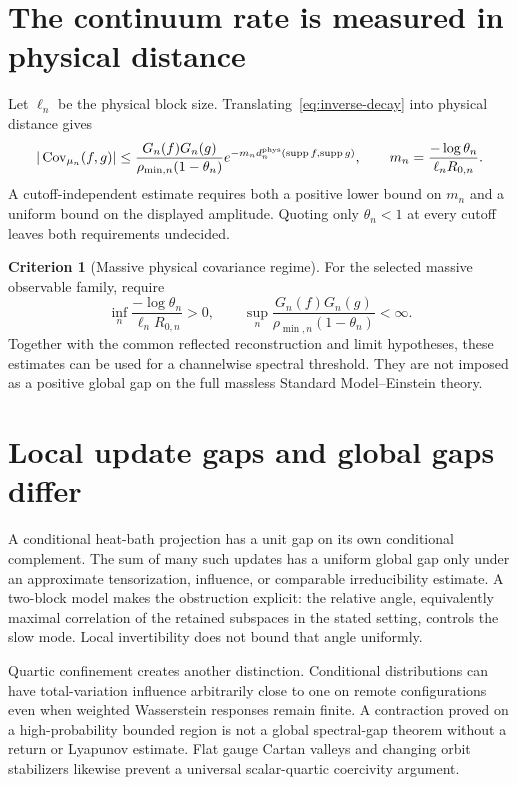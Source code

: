 \documentclass[11pt,a4paper,oneside]{book}
\theoremstyle{plain}
\theoremstyle{definition}
\newtheorem{criterion}[theorem]{Criterion}
\theoremstyle{remark}
\newcommand{\Cov}{\operatorname{Cov}}
\newcommand{\supp}{\operatorname{supp}}
\newcommand{\src}[2]{\cite{#1}}
\begin{document}
\section{The continuum rate is measured in physical distance}
Let $\ell_n$ be the physical block size. Translating~\eqref{eq:inverse-decay} into physical distance gives
\begin{equation}
 |\Cov_{\mu_n}(f,g)|\le
 \frac{G_n(f)G_n(g)}{\rho_{\min,n}(1-\theta_n)}
 e^{-m_n d_n^{\rm phys}(\supp f,\supp g)},
 \qquad
 m_n=\frac{-\log\theta_n}{\ell_nR_{0,n}}.
 \label{eq:physical-decay}
\end{equation}
A cutoff-independent estimate requires both a positive lower bound on $m_n$ and a uniform bound on the displayed amplitude. Quoting only $\theta_n<1$ at every cutoff leaves both requirements undecided. \src{R16}{thm:v16v85-physical}

\begin{criterion}[Massive physical covariance regime]
\label{crit:massive}
For the selected massive observable family, require
\begin{equation}
 \inf_n\frac{-\log\theta_n}{\ell_nR_{0,n}}>0,
 \qquad
 \sup_n\frac{G_n(f)G_n(g)}{\rho_{\min,n}(1-\theta_n)}<\infty.
 \label{eq:massive-regime}
\end{equation}
Together with the common reflected reconstruction and limit hypotheses, these estimates can be used for a channelwise spectral threshold. They are not imposed as a positive global gap on the full massless Standard Model--Einstein theory.
\end{criterion}

\section{Local update gaps and global gaps differ}
A conditional heat-bath projection has a unit gap on its own conditional complement. The sum of many such updates has a uniform global gap only under an approximate tensorization, influence, or comparable irreducibility estimate. A two-block model makes the obstruction explicit: the relative angle, equivalently maximal correlation of the retained subspaces in the stated setting, controls the slow mode. Local invertibility does not bound that angle uniformly.

Quartic confinement creates another distinction. Conditional distributions can have total-variation influence arbitrarily close to one on remote configurations even when weighted Wasserstein responses remain finite. A contraction proved on a high-probability bounded region is not a global spectral-gap theorem without a return or Lyapunov estimate. Flat gauge Cartan valleys and changing orbit stabilizers likewise prevent a universal scalar-quartic coercivity argument. \cite{R15,R16}
\end{document}
